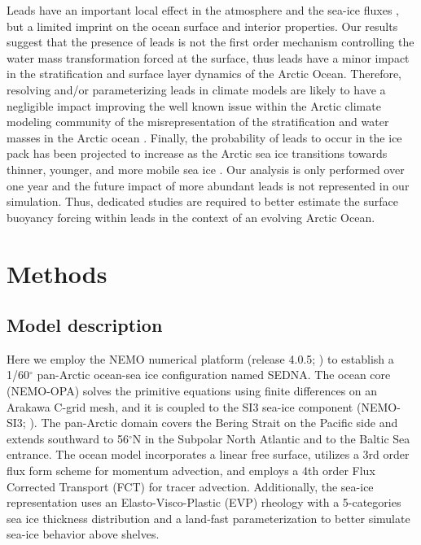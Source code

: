 \documentclass[lineno,sn-basic]{sn-jnl}%
\begin{document}
Leads have an important local effect in the atmosphere and the sea-ice fluxes \citep{Lupkes_leads_2008,Marcq_flux_lead_2012, Wettlaufer_insulator_1997, Smith_polynyas_1990}, but a limited imprint on the ocean surface and interior properties. Our results suggest that the presence of leads is not the first order mechanism controlling the water mass transformation forced at the surface, thus leads have a minor impact in the stratification and surface layer dynamics of the Arctic Ocean.
Therefore, resolving and/or parameterizing leads in climate models are likely to have a negligible impact improving the well known issue within the Arctic climate modeling community of the misrepresentation of the stratification and water masses in the Arctic ocean \citep{Wang_ompi_2024,Ilicak_core_2016}. Finally, the probability of leads to occur in the ice pack has been projected to increase as the Arctic sea ice transitions towards thinner, younger, and more mobile sea ice \citep{Boutin_rheology_2023, IPCC_arctic_2022}. Our analysis is only performed over one year and the future impact of more abundant leads is not represented in our simulation. Thus, dedicated studies are required to better estimate the surface buoyancy forcing within leads in the context of an evolving Arctic Ocean.  

\section{Methods}
\subsection*{Model description}

Here we employ the NEMO numerical platform (release 4.0.5; \citealp{NEMO_man}) to establish a 1/60$^\circ$ pan-Arctic ocean-sea ice configuration named SEDNA. The ocean core (NEMO-OPA) solves the primitive equations using finite differences on an Arakawa C-grid mesh, and it is coupled to the SI3 sea-ice component (NEMO-SI3; \citealp{SI3_man}). The pan-Arctic domain covers the Bering Strait on the Pacific side and extends southward to 56$^\circ$N in the Subpolar North Atlantic and to the Baltic Sea entrance. The ocean model incorporates a linear free surface, utilizes a 3rd order flux form scheme for momentum advection, and employs a 4th order Flux Corrected Transport (FCT) for tracer advection. Additionally, the sea-ice representation uses an Elasto-Visco-Plastic (EVP) rheology with a 5-categories sea ice thickness distribution and a land-fast parameterization to better simulate sea-ice behavior above shelves.
\end{document}
